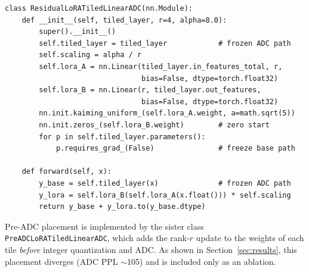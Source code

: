 \documentclass[a4paper,11pt,oneside]{article}
\theoremstyle{breakstyle}
\begin{document}
\begin{lstlisting}[label={lst:lora},caption={Post-ADC residual LoRA wrapper (\texttt{ResidualLoRATiledLinearADC}).}]
class ResidualLoRATiledLinearADC(nn.Module):
    def __init__(self, tiled_layer, r=4, alpha=8.0):
        super().__init__()
        self.tiled_layer = tiled_layer            # frozen ADC path
        self.scaling = alpha / r
        self.lora_A = nn.Linear(tiled_layer.in_features_total, r,
                                bias=False, dtype=torch.float32)
        self.lora_B = nn.Linear(r, tiled_layer.out_features,
                                bias=False, dtype=torch.float32)
        nn.init.kaiming_uniform_(self.lora_A.weight, a=math.sqrt(5))
        nn.init.zeros_(self.lora_B.weight)        # zero start
        for p in self.tiled_layer.parameters():
            p.requires_grad_(False)               # freeze base path

    def forward(self, x):
        y_base = self.tiled_layer(x)              # frozen ADC path
        y_lora = self.lora_B(self.lora_A(x.float())) * self.scaling
        return y_base + y_lora.to(y_base.dtype)
\end{lstlisting}

  Pre-ADC placement is implemented by the sister class
  \texttt{PreADCLoRATiledLinearADC}, which adds the rank-$r$ update to
  the weights of each tile \emph{before} integer quantization and
  ADC. As shown in Section~\ref{sec:results}, this placement diverges
  (ADC PPL $\sim$105) and is included only as an ablation.
\end{document}
